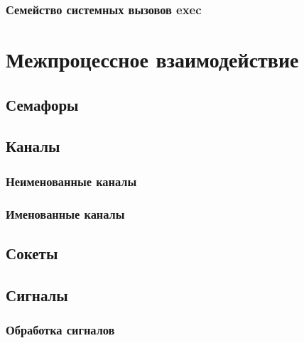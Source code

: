 \documentclass[oneside]{book}
\begin{document}
			\subsection{Семейство системных вызовов exec}
			

	\chapter{Межпроцессное взаимодействие}
		
	
		\section{Семафоры}
		

		\section{Каналы}
			
		
			\subsection{Неименованные каналы}
			
			
			\subsection{Именованные каналы}
				

		\section{Сокеты}
		
		
		\section{Сигналы}
		
		
			\subsection{Обработка сигналов}
				
		
\end{document}
